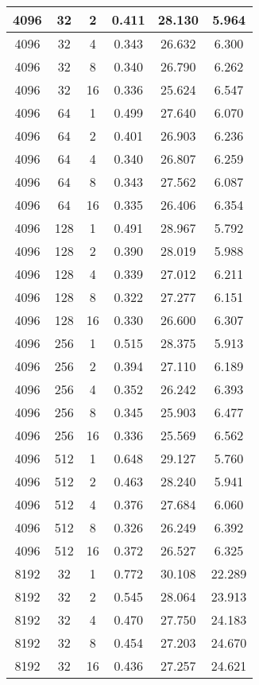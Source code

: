 \begin{longtable}{|c|c|c|c|c|c|}
\hline
4096 & 32 & 2 & 0.411 & 28.130 & 5.964 \\
\hline
4096 & 32 & 4 & 0.343 & 26.632 & 6.300 \\
\hline
4096 & 32 & 8 & 0.340 & 26.790 & 6.262 \\
\hline
4096 & 32 & 16 & 0.336 & 25.624 & 6.547 \\
\hline
4096 & 64 & 1 & 0.499 & 27.640 & 6.070 \\
\hline
4096 & 64 & 2 & 0.401 & 26.903 & 6.236 \\
\hline
4096 & 64 & 4 & 0.340 & 26.807 & 6.259 \\
\hline
4096 & 64 & 8 & 0.343 & 27.562 & 6.087 \\
\hline
4096 & 64 & 16 & 0.335 & 26.406 & 6.354 \\
\hline
4096 & 128 & 1 & 0.491 & 28.967 & 5.792 \\
\hline
4096 & 128 & 2 & 0.390 & 28.019 & 5.988 \\
\hline
4096 & 128 & 4 & 0.339 & 27.012 & 6.211 \\
\hline
4096 & 128 & 8 & 0.322 & 27.277 & 6.151 \\
\hline
4096 & 128 & 16 & 0.330 & 26.600 & 6.307 \\
\hline
4096 & 256 & 1 & 0.515 & 28.375 & 5.913 \\
\hline
4096 & 256 & 2 & 0.394 & 27.110 & 6.189 \\
\hline
4096 & 256 & 4 & 0.352 & 26.242 & 6.393 \\
\hline
4096 & 256 & 8 & 0.345 & 25.903 & 6.477 \\
\hline
4096 & 256 & 16 & 0.336 & 25.569 & 6.562 \\
\hline
4096 & 512 & 1 & 0.648 & 29.127 & 5.760 \\
\hline
4096 & 512 & 2 & 0.463 & 28.240 & 5.941 \\
\hline
4096 & 512 & 4 & 0.376 & 27.684 & 6.060 \\
\hline
4096 & 512 & 8 & 0.326 & 26.249 & 6.392 \\
\hline
4096 & 512 & 16 & 0.372 & 26.527 & 6.325 \\
\hline
8192 & 32 & 1 & 0.772 & 30.108 & 22.289 \\
\hline
8192 & 32 & 2 & 0.545 & 28.064 & 23.913 \\
\hline
8192 & 32 & 4 & 0.470 & 27.750 & 24.183 \\
\hline
8192 & 32 & 8 & 0.454 & 27.203 & 24.670 \\
\hline
8192 & 32 & 16 & 0.436 & 27.257 & 24.621 \\

\end{longtable}
